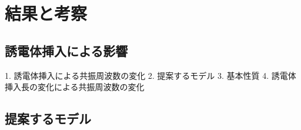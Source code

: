 \chapter{結果と考察}

\section{誘電体挿入による影響}


1. 誘電体挿入による共振周波数の変化
2. 提案するモデル
3. 基本性質
4. 誘電体挿入長の変化による共振周波数の変化

\section{提案するモデル}
